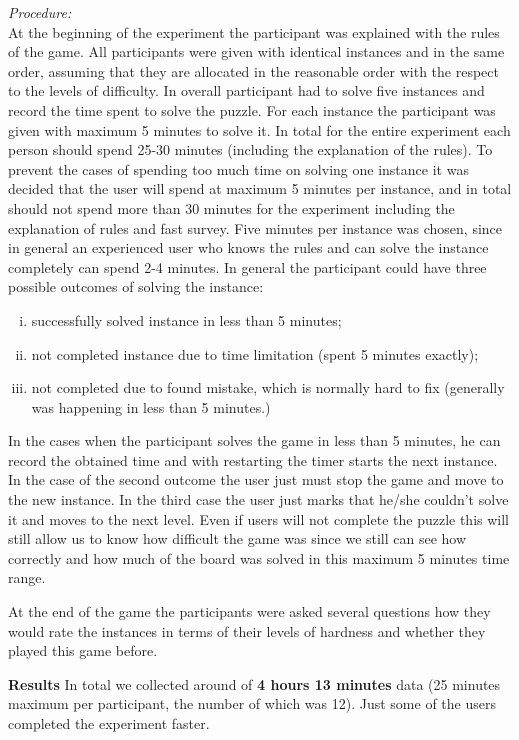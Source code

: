 \textit{Procedure:} \\
At the beginning of the experiment the participant was explained with the rules of the game. 
All participants were given with identical instances and in the same order, assuming that they are allocated in the reasonable order with the respect to the levels of difficulty. In overall participant had to solve five instances and record the time spent to solve the puzzle. For each instance the participant was given with maximum 5 minutes to solve it. In total for the entire experiment each person should spend 25-30 minutes (including the explanation of the rules). To prevent the cases of spending too much time on solving one instance it was decided that the user will spend at maximum 5 minutes per instance, and in total should not spend more than 30 minutes for the experiment including the explanation of rules and fast survey. Five minutes per instance was chosen, since in general an experienced user who knows the rules and can solve the instance completely can spend 2-4 minutes. In general the participant could have three possible outcomes of solving the instance:

\begin{enumerate}[(i)]
    \item successfully solved instance in less than 5 minutes;
    \item not completed instance due to time limitation (spent 5 minutes exactly); 
    \item not completed due to found mistake, which is normally hard to fix (generally was happening in less than 5 minutes.)
\end{enumerate}

In the cases when the participant solves the game in less than 5 minutes, he can record the obtained time and with restarting the timer starts the next instance. In the case of the second outcome the user just must stop the game and move to the new instance. In the third case the user just marks that he/she couldn’t solve it and moves to the next level. 
Even if users will not complete the puzzle this will still allow us to know how difficult the game was since we still can see how correctly and how much of the board was solved in this maximum 5 minutes time range. 

At the end of the game the participants were asked several questions how they would rate the instances in terms of their levels of hardness and whether they played this game before. 

\textbf{Results}
In total we collected around of \textbf{4 hours 13 minutes} data (25 minutes maximum per participant, the number of which was 12). Just some of the users completed the experiment faster. 

